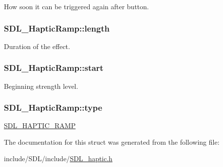 How soon it can be triggered again after button. \hypertarget{struct_s_d_l___haptic_ramp_a57e75237507701405af2a3caf34cdb5a}{
\subsubsection[{length}]{ S\-D\-L\-\_\-\-Haptic\-Ramp\-::length}}\label{struct_s_d_l___haptic_ramp_a57e75237507701405af2a3caf34cdb5a}
Duration of the effect. \hypertarget{struct_s_d_l___haptic_ramp_acc0e813ac6399290fd4a788d2471e8d4}{
\subsubsection[{start}]{ S\-D\-L\-\_\-\-Haptic\-Ramp\-::start}}\label{struct_s_d_l___haptic_ramp_acc0e813ac6399290fd4a788d2471e8d4}
Beginning strength level. \hypertarget{struct_s_d_l___haptic_ramp_aca1c2349372433822ab62f60976640aa}{
\subsubsection[{type}]{ S\-D\-L\-\_\-\-Haptic\-Ramp\-::type}}\label{struct_s_d_l___haptic_ramp_aca1c2349372433822ab62f60976640aa}
\hyperlink{_s_d_l__haptic_8h_af10eb937a64a8f602e9c46682ac0d868}{S\-D\-L\-\_\-\-H\-A\-P\-T\-I\-C\-\_\-\-R\-A\-M\-P} 

The documentation for this struct was generated from the following file\-:\begin{DoxyCompactItemize}
\item 
include/\-S\-D\-L/include/\hyperlink{_s_d_l__haptic_8h}{S\-D\-L\-\_\-haptic.\-h}\end{DoxyCompactItemize}
